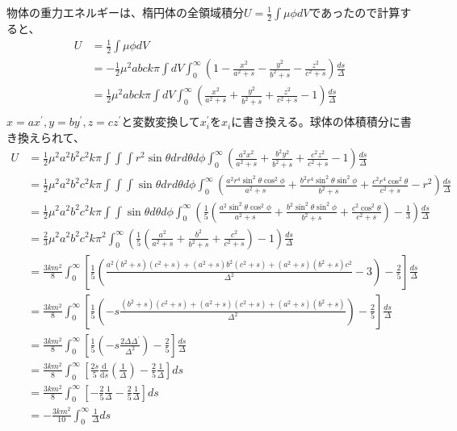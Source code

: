 \documentclass{jsarticle}
\newcommand{\dder}[2][]{\frac{\mathrm{d}#1}{\mathrm{d}#2}}
\newcommand{\half}{\frac{1}{2}}
\begin{document}
物体の重力エネルギーは、楕円体の全領域積分$U = \half \int \mu \phi dV$であったので計算すると、
\begin{align}
    U &= \half \int \mu \phi dV\\
      &= - \half \mu^2 abck \pi \int dV \int_{0}^{\infty} \left(1 - \frac{x^2}{a^2+ s} - \frac{y^2}{b^2+ s}- \frac{z^2}{c^2+ s}\right)\frac{ds}{\Delta}\\
      &= \half \mu^2 abck \pi \int dV \int_{0}^{\infty} \left(\frac{x^2}{a^2+ s} + \frac{y^2}{b^2+ s}+ \frac{z^2}{c^2+ s} - 1 \right)\frac{ds}{\Delta}\\
\end{align}
$x = a x^\prime, y = b y^\prime , z = c z^\prime$と変数変換して$x_i^\prime$を$x_i$に書き換える。球体の体積積分に書き換えられて、
\begin{align}
U &= \half \mu^2 a^2 b^2 c^2 k \pi \int \int \int r^2 \sin\theta dr d\theta d\phi \int_{0}^{\infty} \left(\frac{a^2 x^2}{a^2+ s} + \frac{b^2 y^2}{b^2+ s}+ \frac{c^2 z^2}{c^2+ s} - 1 \right)\frac{ds}{\Delta}\\
  &= \half \mu^2 a^2 b^2 c^2 k \pi \int \int \int \sin\theta dr d\theta d\phi \int_{0}^{\infty} \left(\frac{a^2 r^4 \sin^2\theta\cos^2\phi}{a^2+ s} + \frac{b^2 r^4 \sin^2\theta \sin^2 \phi}{b^2+ s}+ \frac{c^2 r^4 \cos^2\theta}{c^2+ s} - r^2 \right)\frac{ds}{\Delta}\\
  &= \half \mu^2 a^2 b^2 c^2 k \pi \int \int \sin\theta d\theta d\phi \int_{0}^{\infty} \left( \frac{1}{5}\left(\frac{a^2 \sin^2\theta\cos^2\phi}{a^2+ s} + \frac{b^2 \sin^2\theta \sin^2 \phi}{b^2+ s}+ \frac{c^2 \cos^2\theta}{c^2+ s}\right) - \frac{1}{3} \right)\frac{ds}{\Delta}\\
  &=  \frac{2}{3} \mu^2 a^2 b^2 c^2 k \pi^2 \int_{0}^{\infty} \left( \frac{1}{5} \left(\frac{a^2}{a^2+ s} + \frac{b^2}{b^2+ s}+ \frac{c^2}{c^2+ s} \right) - 1 \right)\frac{ds}{\Delta}\\
  &= \frac{3km^2}{8} \int_0^\infty \left[\frac{1}{5}\left(\frac{a^2(b^2 + s)(c^2 + s)+(a^2 + s)b^2(c^2 + s)+ (a^2 + s)(b^2 + s)c^2}{\Delta^2} - 3 \right) - \frac{2}{5}\right]\frac{ds}{\Delta}\\
  &= \frac{3km^2}{8} \int_0^\infty \left[\frac{1}{5}\left(-s\frac{(b^2 + s)(c^2 + s)+(a^2 + s)(c^2 + s)+ (a^2 + s)(b^2 + s)}{\Delta^2}\right) - \frac{2}{5}\right]\frac{ds}{\Delta}\\
  &= \frac{3km^2}{8} \int_0^\infty \left[\frac{1}{5}\left(-s\frac{2\Delta\Delta^\prime}{\Delta^2}\right) - \frac{2}{5}\right]\frac{ds}{\Delta}\\
  &= \frac{3km^2}{8} \int_0^\infty \left[\frac{2s}{5}\dder[]{s}( \frac{1}{\Delta}) - \frac{2}{5}\frac{1}{\Delta}\right]ds\\
  &= \frac{3km^2}{8} \int_0^\infty \left[-\frac{2}{5}\frac{1}{\Delta} - \frac{2}{5}\frac{1}{\Delta}\right]ds\\
  &= - \frac{3km^2}{10} \int_0^\infty \frac{1}{\Delta}ds
\end{align}
\end{document}
